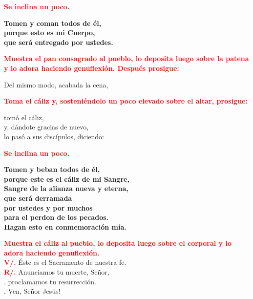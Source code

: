 \documentclass[12pt, letterpaper]{report}
\begin{document}
\large{\bfseries \textcolor{red}{Se inclina un poco.}} \newline

\LARGE{ \bfseries{ Tomen y coman todos de \'el,\\
porque esto es mi Cuerpo,\\
que ser\'a entregado por ustedes.}}\newline

\large{\bfseries \textcolor{red}{Muestra el pan consagrado al pueblo, lo deposita luego sobre la patena y lo adora haciendo genuflexi\'on. Despu\'es prosigue:}}\newline

\Large Del mismo modo, acabada la cena,\newline

\large{\bfseries \textcolor{red}{Toma el c\'aliz y, sosteni\'endolo un poco elevado sobre el altar, prosigue:}}\newline

\Large tom\'o el c\'aliz,\\
y, d\'andote gracias de nuevo,\\
lo pas\'o a sus disc\'ipulos, diciendo:\newline

\large{\bfseries \textcolor{red}{Se inclina un poco.}}\newline

\LARGE{ \bfseries{ Tomen y beban todos de \'el,\\
porque este es el c\'aliz de mi Sangre,\\
Sangre de la alianza nueva y eterna,\\
que ser\'a derramada\\
por ustedes y por muchos\\
para el perdon de los pecados.\\
Hagan esto en conmemoraci\'on m\'ia.}}\newline

\large{\bfseries \textcolor{red}{Muestra el c\'aliz al pueblo, lo deposita luego sobre el corporal y lo adora haciendo genuflexi\'on.}} \newline \\

\noindent
\Large {\bfseries \textcolor{red}{V/.}} \hspace{0.5cm} \'Este es el Sacramento de nuestra fe.\\
\Large {\bfseries \textcolor{red}{R/.}} \hspace{0.5cm} Anunciamos tu muerte, Se\~nor,\\
. \hspace{1.5cm} proclamamos tu resurrecci\'on.\\
. \hspace{1.5cm} Ven, Se\~nor Jes\'us!\newline
\end{document}
